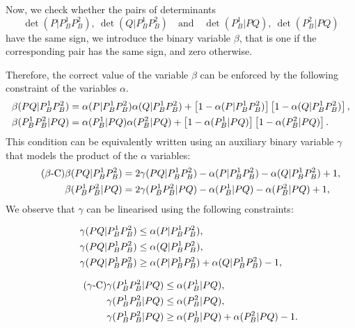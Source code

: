 \documentclass[a4paper,  review, authoryear, 1p.]{elsarticle}
\newcommand{\determinant}[3]{\det({#1|#2#3})}
\begin{document}
		
	\newcommand{\betamas}[4]{\beta(#1#2|#3#4)}
	
	Now, we check whether the pairs of determinants 
	\begin{equation}\label{eq:pair}
		\determinant{P}{P_B^1}{P_B^2},\: \determinant{Q}{P_B^1}{P_B^2}\quad \text{and} \quad \determinant{P_B^1}{P}{Q},\:	 \determinant{P_B^2}{P}{Q}
	\end{equation} 
	have the same sign, we introduce the binary variable $\beta$, that is one if the corresponding pair has the same sign, and zero otherwise.
	
	\newcommand{\gammaprod}[4]{\gamma(#1#2|#3#4)}
	
	Therefore, the correct value of the variable $\beta$ can be enforced by the following constraint of the variables $\alpha$.
	\begin{align*}%
		\betamas{P}{Q}{P_B^1}{P_B^2}&=\alphamas{P}{P_B^1}{P_B^2}\alphamas{Q}{P_B^1}{P_B^2} + \left[1-\alphamas{P}{P_B^1}{P_B^2}\right]\left[1-\alphamas{Q}{P_B^1}{P_B^2}\right],\\
		\betamas{P_B^1}{P_B^2}{P}{Q}&=\alphamas{P_B^1}{P}{Q}\alphamas{P_B^2}{P}{Q} + \left[1-\alphamas{P_B^1}{P}{Q}\right]\left[1-\alphamas{P_B^2}{P}{Q}\right].
	\end{align*}
	This condition can be equivalently written using an auxiliary binary variable $\gamma$ that models the product of the $\alpha$ variables:
	\begin{align*}\tag{$\beta$-C}\label{eq:betaC}
		\betamas{P}{Q}{P_B^1}{P_B^2}&=2\gammaprod{P}{Q}{P_B^1}{P_B^2} -\alphamas{P}{P_B^1}{P_B^2}-\alphamas{Q}{P_B^1}{P_B^2}+1,\\
		\betamas{P_B^1}{P_B^2}{P}{Q}&=2\gammaprod{P_B^1}{P_B^2}{P}{Q} -\alphamas{P_B^1}{P}{Q}-\alphamas{P_B^2}{P}{Q}+1,
	\end{align*}
	We observe that $\gamma$ can be linearised using the following constraints:
	
	\begin{minipage}{.5\linewidth}
		\begin{align*}
			\gammaprod{P}{Q}{P_B^1}{P_B^2} & \leq \alphamas{P}{P_B^1}{P_B^2},\\
			\gammaprod{P}{Q}{P_B^1}{P_B^2} & \leq \alphamas{Q}{P_B^1}{P_B^2},\\
			\gammaprod{P}{Q}{P_B^1}{P_B^2} & \geq \alphamas{P}{P_B^1}{P_B^2} + \alphamas{Q}{P_B^1}{P_B^2} - 1,
		\end{align*}
	\end{minipage}
	\begin{minipage}{.5\linewidth}
		\begin{align*}\tag{$\gamma$-C}\label{eq:gammaC}
			\gammaprod{P_B^1}{P_B^2}{P}{Q} & \leq \alphamas{P_B^1}{P}{Q},\\
			\gammaprod{P_B^1}{P_B^2}{P}{Q} & \leq \alphamas{P_B^2}{P}{Q},\\
			\gammaprod{P_B^1}{P_B^2}{P}{Q} & \geq \alphamas{P_B^1}{P}{Q} + \alphamas{P_B^2}{P}{Q} - 1.
		\end{align*}
	\end{minipage}
	
\end{document}
